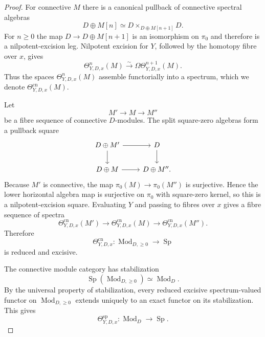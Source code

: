 \begin{proof}
For connective $M$ there is a canonical pullback of connective spectral
algebras
\[
    D\oplus M[n]
    \simeq
    D\times_{D\oplus M[n+1]}D.
\]
For $n\ge0$ the map $D\to D\oplus M[n+1]$ is an isomorphism on $\pi_0$ and
therefore is a nilpotent-excision leg.  Nilpotent excision for $Y$, followed
by the homotopy fibre over $x$, gives
\[
    \Theta^n_{Y,D,x}(M)
    \xrightarrow{\sim}
    \Omega\Theta^{n+1}_{Y,D,x}(M).
\]
Thus the spaces $\Theta^n_{Y,D,x}(M)$ assemble functorially into a spectrum,
which we denote $\Theta^{\mathrm{cn}}_{Y,D,x}(M)$.

Let
\[
    M'\longrightarrow M\longrightarrow M''
\]
be a fibre sequence of connective $D$-modules.  The split square-zero algebras
form a pullback square
\[
\begin{tikzcd}
D\oplus M' \arrow[r] \arrow[d] &
D \arrow[d]\\
D\oplus M \arrow[r] &
D\oplus M''.
\end{tikzcd}
\]
Because $M'$ is connective, the map
$\pi_0(M)\to\pi_0(M'')$ is surjective.  Hence the lower horizontal algebra
map is surjective on $\pi_0$ with square-zero kernel, so this is a
nilpotent-excision square.  Evaluating $Y$ and passing to fibres over $x$
gives a fibre sequence of spectra
\[
    \Theta^{\mathrm{cn}}_{Y,D,x}(M')
    \longrightarrow
    \Theta^{\mathrm{cn}}_{Y,D,x}(M)
    \longrightarrow
    \Theta^{\mathrm{cn}}_{Y,D,x}(M'').
\]
Therefore
\[
    \Theta^{\mathrm{cn}}_{Y,D,x}:
    \operatorname{Mod}_{D,\ge0}
    \longrightarrow
    \operatorname{Sp}
\]
is reduced and excisive.

The connective module category has stabilization
\[
\boxed{
    \operatorname{Sp}
    \left(
      \operatorname{Mod}_{D,\ge0}
    \right)
    \simeq
    \operatorname{Mod}_D.}
\]
By the universal property of stabilization, every reduced excisive
spectrum-valued functor on $\operatorname{Mod}_{D,\ge0}$ extends uniquely to
an exact functor on its stabilization.  This gives
\[
    \Theta^{\mathrm{sp}}_{Y,D,x}:
    \operatorname{Mod}_D\to\operatorname{Sp}.
\]


\end{proof}
